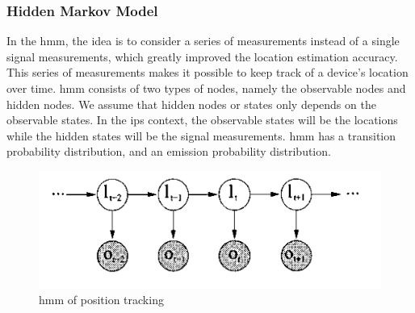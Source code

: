 \subsubsection{Hidden Markov Model}
In the \gls{hmm}, the idea is to consider a series of measurements instead of a single signal measurements, which greatly improved the location estimation accuracy. This series of measurements makes it possible to keep track of a device's location over time. \gls{hmm} consists of two types of nodes, namely the observable nodes and hidden nodes. We assume that hidden nodes or states only depends on the observable states. In the \gls{ips} context, the observable states will be the locations while the hidden states will be the signal measurements. \gls{hmm} has a transition probability distribution, and an emission probability distribution. 
\begin{figure}[h]
    \centering
    \includegraphics[scale=1.6]{Images/ProblemAnalysis/hmm_pe.PNG}
    \caption{\gls{hmm} of position tracking}
    \label{fig:hmm}
\end{figure}
